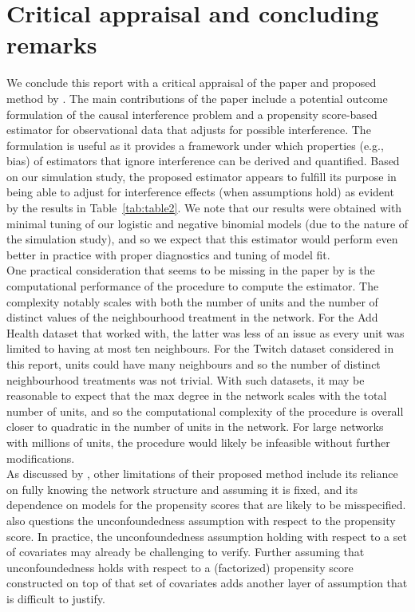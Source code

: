 \documentclass[10pt]{article}
\begin{document}
\section{Critical appraisal and concluding remarks} \label{sec:critique}

We conclude this report with a critical appraisal of the paper and proposed method by \textcite{Forastiere:2021}. The main contributions of the paper include a potential outcome formulation of the causal interference problem and a propensity score-based estimator for observational data that adjusts for possible interference. The formulation is useful as it provides a framework under which properties (e.g., bias) of estimators that ignore interference can be derived and quantified. Based on our simulation study, the proposed estimator appears to fulfill its purpose in being able to adjust for interference effects (when assumptions hold) as evident by the results in Table~\ref{tab:table2}. We note that our results were obtained with minimal tuning of our logistic and negative binomial models (due to the nature of the simulation study), and so we expect that this estimator would perform even better in practice with proper diagnostics and tuning of model fit.
\\

One practical consideration that seems to be missing in the paper by \textcite{Forastiere:2021} is the computational performance of the procedure to compute the estimator. The complexity notably scales with both the number of units and the number of distinct values of the neighbourhood treatment in the network. For the Add Health dataset that \citeauthor{Forastiere:2021} worked with, the latter was less of an issue as every unit was limited to having at most ten neighbours. For the Twitch dataset considered in this report, units could have many neighbours and so the number of distinct neighbourhood treatments was not trivial. With such datasets, it may be reasonable to expect that the max degree in the network scales with the total number of units, and so the computational complexity of the procedure is overall closer to quadratic in the number of units in the network. For large networks with millions of units, the procedure would likely be infeasible without further modifications.
\\

As discussed by \textcite{Forastiere:2021}, other limitations of their proposed method include its reliance on fully knowing the network structure and assuming it is fixed, and its dependence on models for the propensity scores that are likely to be misspecified. \textcite{Sanchez:2021} also questions the unconfoundedness assumption with respect to the propensity score. In practice, the unconfoundedness assumption holding with respect to a set of covariates may already be challenging to verify. Further assuming that unconfoundedness holds with respect to a (factorized) propensity score constructed on top of that set of covariates adds another layer of assumption that is difficult to justify.
\\
\end{document}

